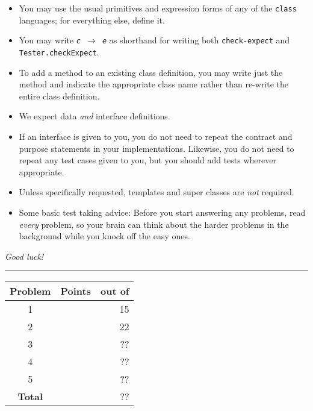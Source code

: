 \documentclass[12pt]{article}                   %
\newcommand\code[1]{\texttt{#1}}
\begin{document}
\noindent\begin{minipage}{8cm}\sloppy
\begin{itemize}
\item You may use the usual primitives and expression forms of any of
  the \code{class} languages; for everything else, define it.

\item You may write {\tt {\slshape c} $\rightarrow$ {\slshape e}} as
  shorthand for writing both {\tt check-expect} and {\tt
    Tester.checkExpect}.

\item To add a method to an existing class definition, you
  may write just the method and indicate the appropriate class name
  rather than re-write the entire class definition.

\item We expect data \emph{and} interface definitions.

\item If an interface is given to you, you do not need to repeat the
  contract and purpose statements in your implementations.  Likewise,
  you do not need to repeat any test cases given to you, but you
  should add tests wherever appropriate.



\item Unless specifically requested, templates and super classes are
  \emph{not} required.

\item Some basic test taking advice: Before you start answering
any problems, read \emph{every} problem, so your brain can  think
about the harder problems in the background while you knock off the easy ones.
\end{itemize}

\bigskip

\emph{Good luck!}
\end{minipage}\hfil\begin{minipage}[t]{6cm}
\rule{1cm}{0pt}\begin{tabular}{|c|l|@{/}r|}
\hline
{\bf Problem} & Points & out of \\ \hline
1 & & 15\\ \hline
2 & & 22\\ \hline
3 & & ??\\ \hline
4 & & ??\\ \hline
5 & & ??\\ \hline
{\bf Total} & & ?? \\ \hline
\end{tabular}
\end{minipage}
\end{document}
